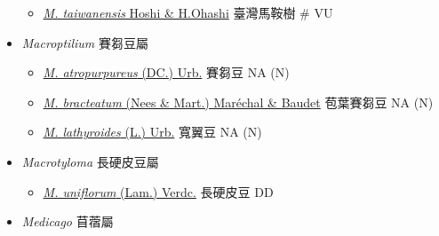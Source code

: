 \begin{itemize}
  \begin{itemize}
        \item[] \href{http://www.theplantlist.org/tpl1.1/search?q=Maackia+taiwanensis}{\textit{M. taiwanensis} Hoshi \& H.Ohashi}   臺灣馬鞍樹  \# VU
  \end{itemize}
 \item[] \textit{Macroptilium} 賽芻豆屬
                                
  \begin{itemize}
        \item[] \href{http://www.theplantlist.org/tpl1.1/search?q=Macroptilium+atropurpureus}{\textit{M. atropurpureus} (DC.) Urb.}   賽芻豆   NA (N)
        \item[] \href{http://www.theplantlist.org/tpl1.1/search?q=Macroptilium+bracteatum}{\textit{M. bracteatum} (Nees \& Mart.) Maréchal \& Baudet}   苞葉賽芻豆   NA (N)
        \item[] \href{http://www.theplantlist.org/tpl1.1/search?q=Macroptilium+lathyroides}{\textit{M. lathyroides} (L.) Urb.}   寬翼豆   NA (N)
  \end{itemize}
 \item[] \textit{Macrotyloma} 長硬皮豆屬
                                
  \begin{itemize}
        \item[] \href{http://www.theplantlist.org/tpl1.1/search?q=Macrotyloma+uniflorum}{\textit{M. uniflorum} (Lam.) Verdc.}   長硬皮豆   DD
  \end{itemize}
 \item[] \textit{Medicago} 苜蓿屬
                                

\end{itemize}
